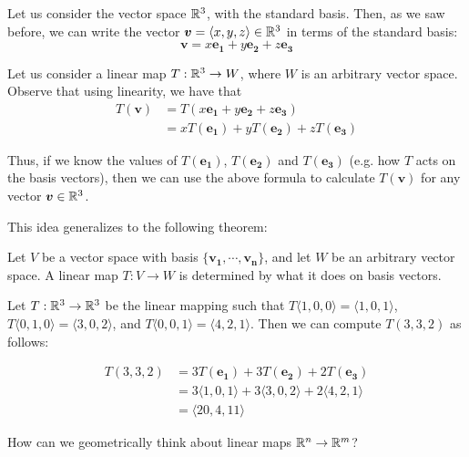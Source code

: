     \begin{example}
    Let us consider the vector space $\mathbb{R}^3$, with the standard basis.  Then, as we saw before, we can write the vector $\bm{v} = \langle x, y,z \rangle \in \mathbb{R}^3$ in terms of the standard basis:
    $$\bm{v} = x\bm{e_1} + y\bm{e_2} + z\bm{e_3}$$
    
    Let us consider a linear map $T : \mathbb{R}^3 \to W$, where $W$ is an arbitrary vector space.  Observe that using linearity, we have that
    \begin{align*}
        T(\bm{v}) &= T(x\bm{e_1} + y\bm{e_2} + z\bm{e_3}) \\
        &= xT(\bm{e_1}) + yT(\bm{e_2}) + zT(\bm{e_3})
    \end{align*}
    
    Thus, if we know the values of $T(\bm{e_1})$, $T(\bm{e_2})$ and $T(\bm{e_3})$ (e.g. how $T$ acts on the basis vectors), then we can use the above formula to calculate $T(\bm{v})$ for any vector $\bm{v} \in \mathbb{R}^3$.  
    
    \end{example}

    This idea generalizes to the following theorem:
    
    \begin{theorem}\label{linearbasisvectors}
    Let $V$ be a vector space with basis $\{\bm{v_1}, \cdots, \bm{v_n}\}$, and let $W$ be an arbitrary vector space.  A linear map $T: V \to W$ is determined by what it does on basis vectors.
    \end{theorem}

    \begin{example}
    Let $T : \mathbb{R}^3 \to \mathbb{R}^3$ be the linear mapping such that $T\langle1,0,0\rangle = \langle1,0,1\rangle$, $T\langle0,1,0\rangle = \langle3,0,2\rangle$, and $T\langle0,0,1\rangle = \langle4,2,1\rangle$. Then we can compute $T(3, 3, 2)$ as follows:

    \begin{align*}
        T(3, 3, 2) &= 3T(\bm{e_1}) + 3T(\bm{e_2}) + 2T(\bm{e_3}) \\
        &= 3\langle1,0,1\rangle + 3\langle3,0,2\rangle + 2\langle4,2,1\rangle \\
        &= \langle 20, 4, 11 \rangle
    \end{align*}
    
    \end{example}

\begin{motivating}
How can we geometrically think about linear maps $\mathbb{R}^n \to \mathbb{R}^m$?
\end{motivating}

